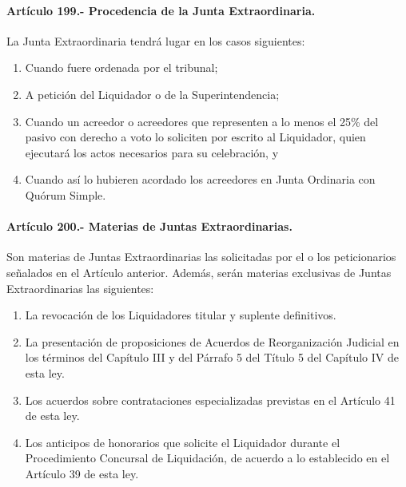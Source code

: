 \documentclass[
]{book}
\begin{document}
\hypertarget{artuxedculo-199.--procedencia-de-la-junta-extraordinaria.}{%
\paragraph*{Artículo 199.- Procedencia de la Junta Extraordinaria.}\label{artuxedculo-199.--procedencia-de-la-junta-extraordinaria.}}

La Junta Extraordinaria tendrá lugar en los casos siguientes:

\begin{enumerate}
\def\labelenumi{\alph{enumi})}
\item
  Cuando fuere ordenada por el tribunal;
\item
  A petición del Liquidador o de la Superintendencia;
\item
  Cuando un acreedor o acreedores que representen a lo menos el 25\% del pasivo con derecho a voto lo soliciten por escrito al Liquidador, quien ejecutará los actos necesarios para su celebración, y
\item
  Cuando así lo hubieren acordado los acreedores en Junta Ordinaria con Quórum Simple.
\end{enumerate}

\hypertarget{artuxedculo-200.--materias-de-juntas-extraordinarias.}{%
\paragraph*{Artículo 200.- Materias de Juntas Extraordinarias.}\label{artuxedculo-200.--materias-de-juntas-extraordinarias.}}

Son materias de Juntas Extraordinarias las solicitadas por el o los peticionarios señalados en el Artículo anterior. Además, serán materias exclusivas de Juntas Extraordinarias las siguientes:

\begin{enumerate}
\def\labelenumi{\arabic{enumi})}
\item
  La revocación de los Liquidadores titular y suplente definitivos.
\item
  La presentación de proposiciones de Acuerdos de Reorganización Judicial en los términos del Capítulo III y del Párrafo 5 del Título 5 del Capítulo IV de esta ley.
\item
  Los acuerdos sobre contrataciones especializadas previstas en el Artículo 41 de esta ley.
\item
  Los anticipos de honorarios que solicite el Liquidador durante el Procedimiento Concursal de Liquidación, de acuerdo a lo establecido en el Artículo 39 de esta ley.
\end{enumerate}
\end{document}
